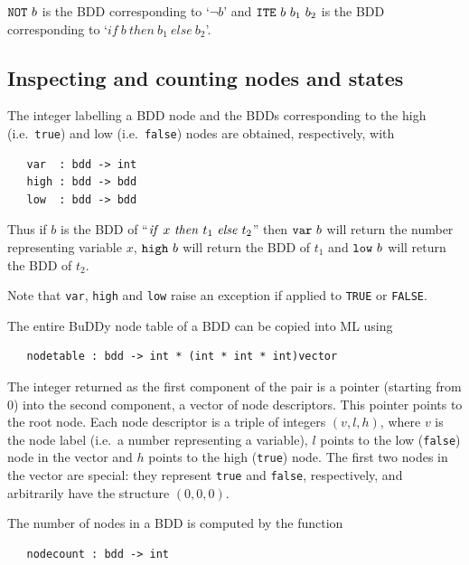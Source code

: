 \documentclass[12pt,fleqn]{article}
\renewcommand{\t}[1]{\mbox{\tt #1}}
\newcommand{\Buddy}{BuDDy{}}
\begin{document}
$\t{NOT}~b$ is the BDD corresponding to  `$\neg b$' and $\t{ITE}~b~b_1~b_2$ is the BDD corresponding
to `$if~b~then~b_1~else~b_2$'.




\subsection{Inspecting and counting nodes and states}

The integer labelling a BDD node and the BDDs corresponding to the high
(i.e.~{\t{true}}) and low (i.e.~{\t{false}}) nodes are obtained,
respectively, with

\begin{verbatim}
   var  : bdd -> int
   high : bdd -> bdd
   low  : bdd -> bdd
\end{verbatim}

Thus if $b$ is the BDD of ``${\it{if}}~x~{\it{then}}~t_1~{\it{else}}~t_2$''
then $\t{var}~b$ will return the number representing variable $x$,
$\t{high}~b$ will return the BDD of $t_1$ and $\t{low}~b$ will return
the BDD of $t_2$.

Note that \t{var}, \t{high} and \t{low} raise an exception if applied
to \t{TRUE} or \t{FALSE}.

The entire \Buddy{} node table of a BDD can be copied into ML using

\begin{verbatim}
   nodetable : bdd -> int * (int * int * int)vector
\end{verbatim}

The integer returned as the first component of the pair is a pointer
(starting from 0) into the second component, a vector of node
descriptors. This pointer points to the root node. Each node
descriptor is a triple of integers $(v,l,h)$, where $v$ is the node
label (i.e.~a number representing a variable), $l$ points to the low
({\t{false}}) node in the vector and $h$ points to the high
({\t{true}}) node. The first two nodes in the vector are special:
they represent {\t{true}} and {\t{false}}, respectively, and arbitrarily have
the structure $(0,0,0)$.

The number of nodes in a BDD is computed by the function

\begin{verbatim}
   nodecount : bdd -> int
\end{verbatim}
\end{document}
